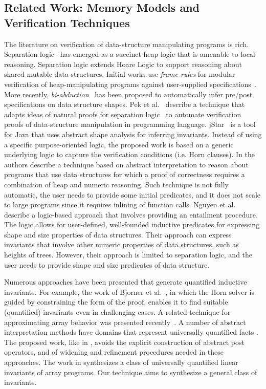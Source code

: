 \subsection{Related Work: Memory Models and Verification Techniques}
\label{sec-existing}

The literature on verification of data-structure manipulating 
programs is rich. Separation logic~\cite{Reynolds02,IshtiaqO01} has
emerged as a succinct heap logic that is amenable to local
reasoning. Separation logic extends Hoare Logic to support reasoning
about shared mutable data structures. 
Initial works use {\it frame rules} for modular
verification of heap-manipulating programs 
against user-supplied
specifications~\cite{BerdineCO05}.
More recently, {\it
  bi-abduction}~\cite{calcagno2009compositional} 
   has been proposed to automatically
infer pre/post specifications on data structure shapes. Pek
et al.~\cite{PekQM14} describe a technique that adapts ideas of
natural proofs for separation logic~\cite{Qiu0SM13} to automate
verification proofs of data-structure manipulation in programming
language. jStar~\cite{DistefanoP08} is a tool for Java that uses
abstract shape analysis for inferring invariants. Instead of using a
specific purpose-oriented logic, the proposed work is based on a generic
underlying logic to capture the verification conditions (i.e. Horn
clauses). In \cite{McCloskeyRS10} the authors describe a technique based on
abstract interpretation to reason about programs that use data structures
for which a proof of correctness requires a combination of heap and numeric
reasoning. Such technique is not fully automatic, the user needs to provide some initial 
predicates, and it does not scale to large programs since it requires inlining of 
function calls. 
Nguyen et al.~\cite{NguyenDQC07} describe a logic-based approach that involves providing
an entailment procedure. The logic allows for user-defined, well-founded inductive
predicates for expressing shape and size properties of data structures. Their
approach can express invariants that involve other numeric properties of data
structures, such as heights of trees. However, their approach
is limited to separation logic, and the user needs to provide
shape and size predicates of data structure. 


Numerous approaches have been presented that generate quantified
inductive invariants. For example, the work
of Bjorner et al.\ \cite{BjornerMR13}, in which the Horn solver is
guided by constraining the form of the proof, enables it to find
suitable (quantified) invariants even in challenging cases. A related
technique for approximating array behavior was presented
recently~\cite{DBLP:conf/sas/MonniauxG16}.  A number of abstract
interpretation methods have domains that represent universally
quantified facts \cite{GulwaniMT08,Cousot15}.  The proposed work, like
in \cite{BjornerMR13}, avoids the explicit construction of
abstract post operators, and of widening and refinement procedures needed in
these approaches. The work in \cite{LarrazRR13} synthesizes a class of
universally quantified linear invariants of array programs. Our
technique aims to synthesize a general class of invariants.


